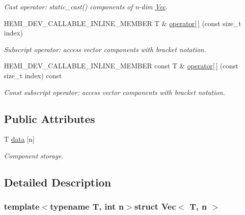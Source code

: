 \begin{DoxyCompactItemize}
\begin{DoxyCompactList}\small\item\em Cast operator\+: static\+\_\+cast() components of n-\/dim \hyperlink{structVec}{Vec}. \end{DoxyCompactList}\item 
H\+E\+M\+I\+\_\+\+D\+E\+V\+\_\+\+C\+A\+L\+L\+A\+B\+L\+E\+\_\+\+I\+N\+L\+I\+N\+E\+\_\+\+M\+E\+M\+B\+E\+R T \& \hyperlink{structVec_af6ec4db0da7c2dbef9a6ce9d0deb6a17}{operator\mbox{[}$\,$\mbox{]}} (const size\+\_\+t index)
\begin{DoxyCompactList}\small\item\em Subscript operator\+: access vector components with bracket notation. \end{DoxyCompactList}\item 
H\+E\+M\+I\+\_\+\+D\+E\+V\+\_\+\+C\+A\+L\+L\+A\+B\+L\+E\+\_\+\+I\+N\+L\+I\+N\+E\+\_\+\+M\+E\+M\+B\+E\+R const T \& \hyperlink{structVec_ac55be8681c862fa0a6d8c75be29d0dc2}{operator\mbox{[}$\,$\mbox{]}} (const size\+\_\+t index) const 
\begin{DoxyCompactList}\small\item\em Const subscript operator\+: access vector components with bracket notation. \end{DoxyCompactList}\end{DoxyCompactItemize}
\subsection*{Public Attributes}
\begin{DoxyCompactItemize}
\item 
\hypertarget{structVec_a76e66063a9a758a351bfd29d104df470}{}T \hyperlink{structVec_a76e66063a9a758a351bfd29d104df470}{data} \mbox{[}n\mbox{]}\label{structVec_a76e66063a9a758a351bfd29d104df470}

\begin{DoxyCompactList}\small\item\em Component storage. \end{DoxyCompactList}\end{DoxyCompactItemize}


\subsection{Detailed Description}
\subsubsection*{template$<$typename T, int n$>$struct Vec$<$ T, n $>$}

